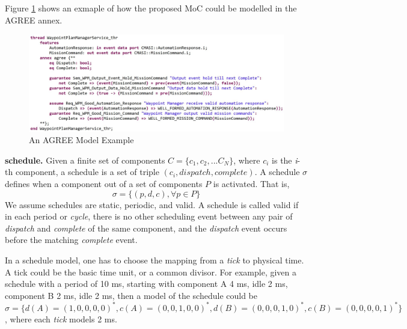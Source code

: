 
Figure \ref{wpmAGREE} shows an exmaple of how the proposed MoC could be modelled in the AGREE annex.

\begin{figure}[ht!]
\centering
\includegraphics[width=120mm]{wpmAGREE.jpg}
\caption{An AGREE Model Example\label{wpmAGREE}}
\end{figure}

{\bf schedule.}
Given a finite set of components $C = \{c_1, c_2,... C_N\}$, where $c_i$ is the \emph{i}-th component, a schedule is a set of triple $(c_i, dispatch, complete)$.
A schedule $\sigma$ defines when a component out of a set of components $P$ is activated. That is,  
$$\sigma = \{(p, d, c), \forall p \in P  \}$$ 
We assume schedules are static, periodic, and valid. A schedule is called valid if in each period or \emph{cycle}, there is no other scheduling event between any pair of \emph{dispatch} and \emph{complete} of the same component, and the \emph{dispatch} event occurs before the matching \emph{complete} event. 

In a schedule model, one has to choose the mapping from a \emph{tick} to physical time. A tick could be the basic time unit, or a common divisor. For example, given a schedule with a period of 10 ms, starting with component A 4 ms, idle 2 ms, component B 2 ms, idle 2 ms, then a model of the schedule could be $\sigma = \{d(A)=(1,0,0,0,0)^*, c(A) = (0,0,1,0,0)^*, d(B) = (0,0,0,1,0)^*, c(B) = (0,0,0,0,1)^*\}$, where each \emph{tick} models 2 ms. 

